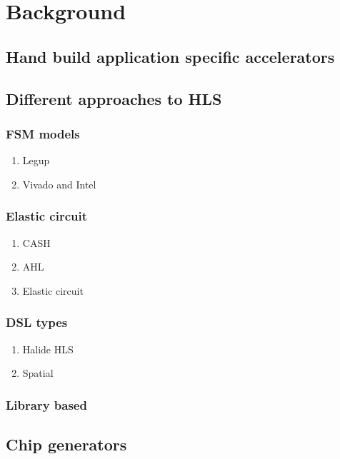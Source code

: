 
\chapter{Background}
\label{background}



\section{Hand build application specific accelerators}

\section{Different approaches to HLS}
\subsection{FSM models}
\begin{enumerate}
    \item Legup
    \item Vivado and Intel
\end{enumerate}

\subsection{Elastic circuit}

\begin{enumerate}
    \item CASH
    \item AHL
    \item Elastic circuit
\end{enumerate}

\subsection{DSL types}
\begin{enumerate}
    \item Halide HLS
    \item Spatial
\end{enumerate}

\subsection{Library based}


\section{Chip generators}

